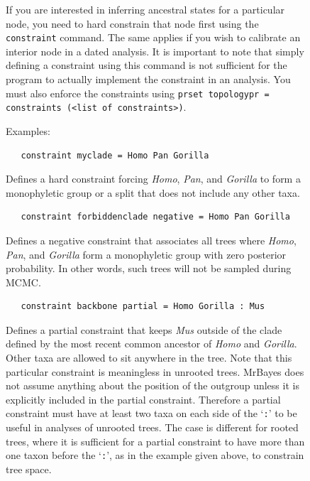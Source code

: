 \documentclass[12pt]{book}
\newcommand{\ttt}[1]{\texttt{#1}}
\begin{document}
\begin{figure}[h]
If you are interested in inferring ancestral states for a particular node, you need to hard
constrain that node first using the \ttt{constraint} command. The same applies if you wish to
calibrate an interior node in a dated analysis. It is important to note that simply defining a
constraint using this command is not sufficient for the program to actually implement the
constraint in an analysis. You must also enforce the constraints using \ttt{prset topologypr =
constraints (<list of constraints>)}.

Examples:

\begin{singlespacing}
\small
\begin{verbatim}
   constraint myclade = Homo Pan Gorilla
\end{verbatim}
\normalsize
\end{singlespacing}

Defines a hard constraint forcing \textit{Homo}, \textit{Pan}, and \textit{Gorilla} to form a
monophyletic group or a split that does not include any other taxa.

\begin{singlespacing}
\small
\begin{verbatim}
   constraint forbiddenclade negative = Homo Pan Gorilla
\end{verbatim}
\normalsize
\end{singlespacing}

Defines a negative constraint that associates all trees where \textit{Homo}, \textit{Pan}, and
\textit{Gorilla} form a monophyletic group with zero posterior probability. In other words, such
trees will not be sampled during MCMC.

\begin{singlespacing}
\small
\begin{verbatim}
   constraint backbone partial = Homo Gorilla : Mus
\end{verbatim}
\normalsize
\end{singlespacing}

Defines a partial constraint that keeps \textit{Mus} outside of the clade defined by the most
recent common ancestor of \textit{Homo} and \textit{Gorilla}. Other taxa are allowed to sit
anywhere in the tree. Note that this particular constraint is meaningless in unrooted trees.
MrBayes does not assume anything about the position of the outgroup unless it is explicitly
included in the partial constraint. Therefore a partial constraint must have at least two taxa on
each side of the `\ttt{:}' to be useful in analyses of unrooted trees. The case is different for
rooted trees, where it is sufficient for a partial constraint to have more than one taxon before
the `\ttt{:}', as in the example given above, to constrain tree space.


\end{figure}
\end{document}
